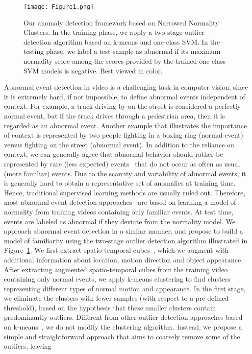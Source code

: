 \documentclass[10pt,twocolumn,letterpaper]{article}
\begin{document}
\begin{figure}[!t]

\begin{center}
\texttt{[image: Figure1.png]}
\end{center}
\vspace*{-0.3cm}
\caption{Our anomaly detection framework based on Narrowed Normality Clusters. In the training phase, we apply a two-stage outlier detection algorithm based on k-means and one-class SVM. In the testing phase, we label a test sample as abnormal if its maximum normality score among the scores provided by the trained one-class SVM models is negative. Best viewed in color.}
\label{fig_pipeline}
\vspace*{-0.45cm}
\end{figure}

Abnormal event detection in video is a challenging task in computer vision, since it is extremely hard, if not impossible, to define abnormal events independent of context. For example, a truck driving by on the street is considered a perfectly normal event, but if the truck drives through a pedestrian area, then it is regarded as an abnormal event. Another example that illustrates the importance of context is represented by two people fighting in a boxing ring (normal event) versus fighting on the street (abnormal event). In addition to the reliance on context, we can generally agree that abnormal behavior should rather be represented by rare (less expected) events~\cite{Itti-CVPR-2005} that do not occur as often as usual (more familiar) events. Due to the scarcity and variability of abnormal events, it is generally hard to obtain a representative set of anomalies at training time. Hence, traditional supervised learning methods are usually ruled out. Therefore, most abnormal event detection approaches~\cite{Antic-ICCV-2011,Cheng-CVPR-2015,Kim-CVPR-2009,Li-PAMI-2014,Lu-ICCV-2013,Mahadevan-CVPR-2010,Mehran-CVPR-2009,Xu-BMVC-2015,Zhao-CVPR-2011} are based on learning a model of normality from training videos containing only familiar events. At test time, events are labeled as abnormal if they deviate from the normality model. We approach abnormal event detection in a similar manner, and propose to build a model of familiarity using the two-stage outlier detection algorithm illustrated in Figure~\ref{fig_pipeline}. We first extract spatio-temporal cubes~\cite{Giorno-ECCV-2016,Ionescu-ICCV-2017,Lu-ICCV-2013}, which we augment with additional information about location, motion direction and object appearance. After extracting augmented spatio-temporal cubes from the training video containing only normal events, we apply k-means clustering to find clusters representing different types of normal motion and appearance. In the first stage, we eliminate the clusters with fewer samples (with respect to a pre-defined threshold), based on the hypothesis that these smaller clusters contain predominantly outliers. Different from other outlier detection approaches based on k-means~\cite{Auslander-SPIE-2011,Chawla-ICDM-2013,Jiang-PRL-2001}, we do not modify the clustering algorithm. Instead, we propose a simple and straightforward approach that aims to coarsely remove some of the outliers, leaving 
\end{document}
